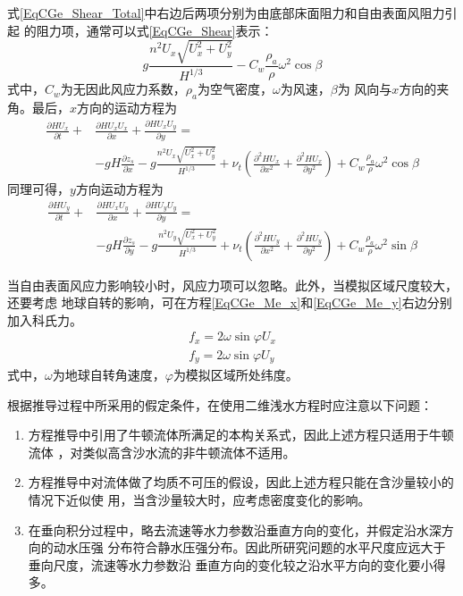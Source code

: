 式\eqref{EqCGe_Shear_Total}中右边后两项分别为由底部床面阻力和自由表面风阻力引起
的阻力项，通常可以式\eqref{EqCGe_Shear}表示：
\begin{equation}
  g\frac{n^{2}U_{x}\sqrt{U_{x}^{2}+U_{y}^{2}}}{H^{1/3}}
  -
  C_{w}\frac{\rho_{a}}{\rho}\omega^{2}\cos\beta
  \label{EqCGe_Shear}
\end{equation}
式中，$C_{w}$为无因此风应力系数，$\rho_{a}$为空气密度，$\omega$为风速，$\beta$为
风向与$x$方向的夹角。最后，$x$方向的运动方程为
\begin{equation}
  \begin{aligned}
  \frac{\partial HU_{x}}{\partial t} +
  &\frac{\partial HU_{x}U_{x}}{\partial x} +
  \frac{\partial HU_{x}U_{y}}{\partial y} 
  =\\
  &-gH\frac{\partial  z_{s}}{\partial x}
  -g\frac{n^{2}U_{x}\sqrt{U_{x}^{2}+U_{y}^{2}}}{H^{1/3}}
  +
  \nu_{t}\left(
    \frac{\partial^{2}HU_{x}}{\partial x^{2}}+
    \frac{\partial^{2}HU_{x}}{\partial y^{2}}
\right)
  +C_{w}\frac{\rho_{a}}{\rho}\omega^{2}\cos\beta
  \end{aligned}
  \label{EqCGe_Me_x}
\end{equation}
同理可得，$y$方向运动方程为
\begin{equation}
  \begin{aligned}
  \frac{\partial HU_{y}}{\partial t} +
  &\frac{\partial HU_{x}U_{y}}{\partial x} +
  \frac{\partial HU_{y}U_{y}}{\partial y} 
  =\\
  &-gH\frac{\partial  z_{s}}{\partial y}
  -g\frac{n^{2}U_{y}\sqrt{U_{x}^{2}+U_{y}^{2}}}{H^{1/3}}
  +
  \nu_{t}\left(
    \frac{\partial^{2}HU_{y}}{\partial x^{2}}+
    \frac{\partial^{2}HU_{y}}{\partial y^{2}}
\right)
  +C_{w}\frac{\rho_{a}}{\rho}\omega^{2}\sin\beta
  \end{aligned}
  \label{EqCGe_Me_y}
\end{equation}

当自由表面风应力影响较小时，风应力项可以忽略。此外，当模拟区域尺度较大，还要考虑
地球自转的影响，可在方程\eqref{EqCGe_Me_x}和\eqref{EqCGe_Me_y}右边分别加入科氏力。
\begin{equation}
  \begin{aligned}
    f_x = 2\omega\sin\varphi U_{x} 
    \\
    f_y = 2\omega\sin\varphi U_{y} 
  \end{aligned}
\end{equation}
式中，$\omega$为地球自转角速度，$\varphi$为模拟区域所处纬度。

根据推导过程中所采用的假定条件，在使用二维浅水方程时应注意以下问题：
\begin{enumerate}
  \item 方程推导中引用了牛顿流体所满足的本构关系式，因此上述方程只适用于牛顿流体
，对类似高含沙水流的非牛顿流体不适用。
 \item 方程推导中对流体做了均质不可压的假设，因此上述方程只能在含沙量较小的情况下近似使
用，当含沙量较大时，应考虑密度变化的影响。
\item 在垂向积分过程中，略去流速等水力参数沿垂直方向的变化，并假定沿水深方向的动水压强
分布符合静水压强分布。因此所研究问题的水平尺度应远大于垂向尺度，流速等水力参数沿
垂直方向的变化较之沿水平方向的变化要小得多。
\end{enumerate}

